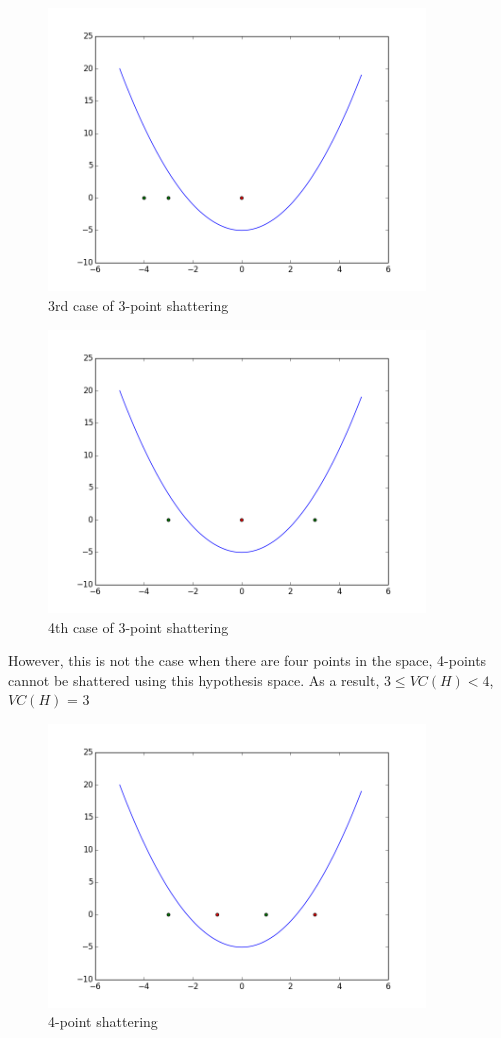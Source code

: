 \documentclass[11pt]{article}
\begin{document}
{	\begin{figure}[h!]
	\centering
	\includegraphics[width = 10cm]{1c}
	\caption{3rd case of 3-point shattering}
	\end{figure}
	
	\begin{figure}[h!]
	\centering
	\includegraphics[width = 10cm]{1d}
	\caption{4th case of 3-point shattering}
	\end{figure}
	
However, this is not the case when there are four points in the space, 4-points cannot be shattered using this hypothesis space. As a result, $3 \leq VC(H) < 4$, $VC(H)$ = 3

	
	\begin{figure}[h!]
	\centering
	\includegraphics[width = 10cm]{1e}
	\caption{4-point shattering}
	\end{figure}
	
}
\end{document}
